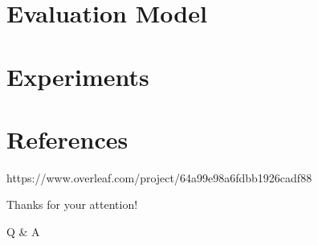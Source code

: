 \documentclass{beamer}
\begin{document}
\section{Evaluation Model}


\section{Experiments}

\section{References}
https://www.overleaf.com/project/64a99e98a6fdbb1926cadf88


\begin{frame}[allowframebreaks]
    
    
\end{frame}

\begin{frame}
    \begin{center}
        {\Huge\calligra Thanks for your attention!}
        \vspace{1cm}

        {\Huge Q \& A}
    \end{center}
\end{frame}
\end{document}
